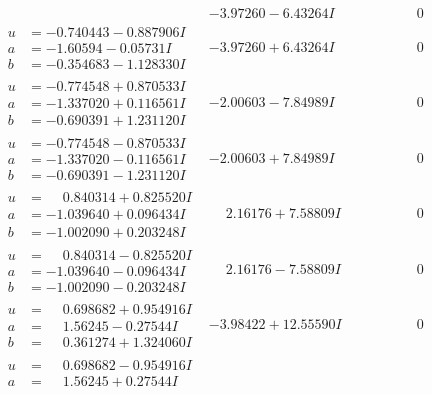 \documentclass[1p]{elsarticle_modified}
\theoremstyle{definition}
\begin{document}
$$\begin{array}{c|c|c}
 & -3.97260 - 6.43264 I & \phantom{-0.000000 } 0 \\ \hline\begin{aligned}
u &= -0.740443 - 0.887906 I \\
a &= -1.60594 - 0.05731 I \\
b &= -0.354683 - 1.128330 I\end{aligned}
 & -3.97260 + 6.43264 I & \phantom{-0.000000 } 0 \\ \hline\begin{aligned}
u &= -0.774548 + 0.870533 I \\
a &= -1.337020 + 0.116561 I \\
b &= -0.690391 + 1.231120 I\end{aligned}
 & -2.00603 - 7.84989 I & \phantom{-0.000000 } 0 \\ \hline\begin{aligned}
u &= -0.774548 - 0.870533 I \\
a &= -1.337020 - 0.116561 I \\
b &= -0.690391 - 1.231120 I\end{aligned}
 & -2.00603 + 7.84989 I & \phantom{-0.000000 } 0 \\ \hline\begin{aligned}
u &= \phantom{-}0.840314 + 0.825520 I \\
a &= -1.039640 + 0.096434 I \\
b &= -1.002090 + 0.203248 I\end{aligned}
 & \phantom{-}2.16176 + 7.58809 I & \phantom{-0.000000 } 0 \\ \hline\begin{aligned}
u &= \phantom{-}0.840314 - 0.825520 I \\
a &= -1.039640 - 0.096434 I \\
b &= -1.002090 - 0.203248 I\end{aligned}
 & \phantom{-}2.16176 - 7.58809 I & \phantom{-0.000000 } 0 \\ \hline\begin{aligned}
u &= \phantom{-}0.698682 + 0.954916 I \\
a &= \phantom{-}1.56245 - 0.27544 I \\
b &= \phantom{-}0.361274 + 1.324060 I\end{aligned}
 & -3.98422 + 12.55590 I & \phantom{-0.000000 } 0 \\ \hline\begin{aligned}
u &= \phantom{-}0.698682 - 0.954916 I \\
a &= \phantom{-}1.56245 + 0.27544 I \\

\end{aligned}
\end{array}$$
\end{document}

